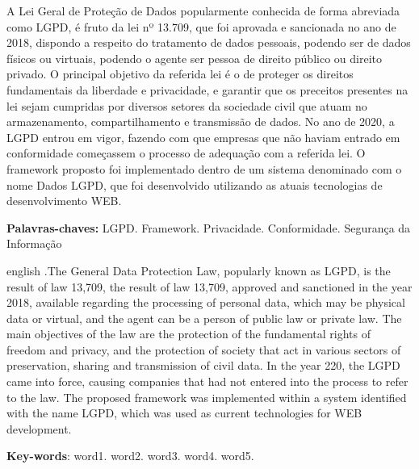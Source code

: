 \documentclass[
	12pt,				%
	openright,			%
	oneside,			%
	a4paper,			%
	english,			%
	french,				%
	spanish,			%
	brazil,				%
	]{abntex2}
\begin{document}
\begin{resumo}
\noindent
A Lei Geral de Proteção de Dados popularmente conhecida de forma abreviada como LGPD, é fruto da lei nº 13.709, que foi aprovada e sancionada no ano de 2018, dispondo a respeito do tratamento de dados pessoais, podendo ser de dados físicos ou virtuais, podendo o agente ser pessoa de direito público ou direito privado. O principal objetivo da referida lei é o de proteger os direitos fundamentais da liberdade e privacidade, e garantir que os preceitos presentes na lei sejam cumpridas por diversos setores da sociedade civil que atuam no armazenamento, compartilhamento e transmissão de dados. No ano de 2020, a LGPD entrou em vigor, fazendo com que empresas que não haviam entrado em conformidade começassem o processo de adequação com a referida lei. O framework proposto foi implementado dentro de um sistema denominado com o nome Dados LGPD, que foi desenvolvido utilizando as atuais tecnologias de desenvolvimento WEB.

 \vspace{\onelineskip}
    
 \noindent
 \textbf{Palavras-chaves:} LGPD. Framework. Privacidade. Conformidade. Segurança da Informação
\end{resumo}

\begin{resumo}[Abstract]
 \begin{otherlanguage*}{english}
   \vspace{\onelineskip}
    \noindent 
.The General Data Protection Law, popularly known as LGPD, is the result of law 13,709, the result of law 13,709, approved and sanctioned in the year 2018, available regarding the processing of personal data, which may be physical data or virtual, and the agent can be a person of public law or private law. The main objectives of the law are the protection of the fundamental rights of freedom and privacy, and the protection of society that act in various sectors of preservation, sharing and transmission of civil data. In the year 220, the LGPD came into force, causing companies that had not entered into the process to refer to the law. The proposed framework was implemented within a system identified with the name LGPD, which was used as current technologies for WEB development.
   
   \vspace{\onelineskip}
   
   \noindent  \textbf{Key-words}:  word1. word2. word3. word4. word5.
 \end{otherlanguage*}
\end{resumo}
\end{document}
